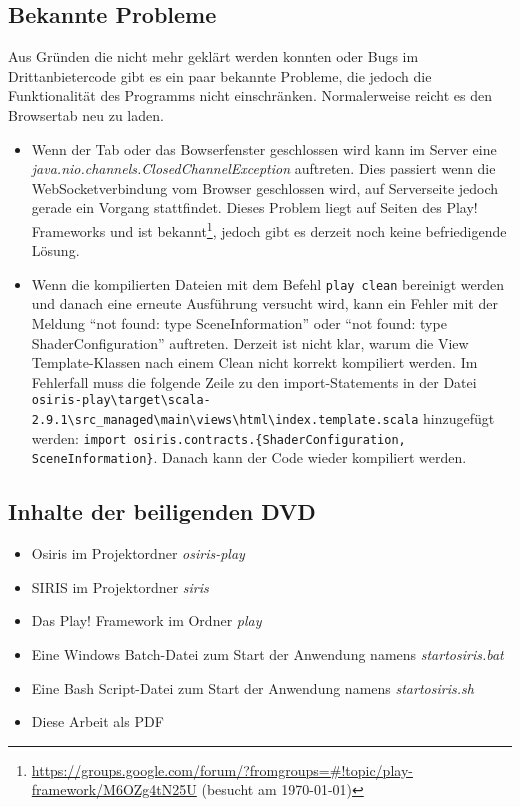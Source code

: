 \begin{appendix}
\subsection*{Bekannte Probleme}
Aus Gründen die nicht mehr geklärt werden konnten oder Bugs im Drittanbietercode gibt es ein paar bekannte Probleme, die jedoch die Funktionalität des Programms nicht einschränken. Normalerweise reicht es den Browsertab neu zu laden.
\begin{itemize}
    \item Wenn der Tab oder das Bowserfenster geschlossen wird kann im Server eine \textit{java.nio.channels.ClosedChannelException} auftreten. Dies passiert wenn die WebSocketverbindung vom Browser geschlossen wird, auf Serverseite jedoch gerade ein Vorgang stattfindet. Dieses Problem liegt auf Seiten des Play! Frameworks und ist bekannt\footnote{\url{https://groups.google.com/forum/?fromgroups=\#!topic/play-framework/M6OZg4tN25U} (besucht am \today)}, jedoch gibt es derzeit noch keine befriedigende Lösung.
    \item Wenn die kompilierten Dateien mit dem Befehl \texttt{play clean} bereinigt werden und danach eine erneute Ausführung versucht wird, kann ein Fehler mit der Meldung "`not found: type SceneInformation"' oder "`not found: type ShaderConfiguration"' auftreten. Derzeit ist nicht klar, warum die View Template-Klassen nach einem Clean nicht korrekt kompiliert werden. Im Fehlerfall muss die folgende Zeile zu den import-Statements in der Datei \texttt{osiris-play\-\textbackslash target\-\textbackslash scala-2.9.1\-\textbackslash src\_managed\-\textbackslash main\-\textbackslash views\-\textbackslash html\-\textbackslash index.template.scala} hinzugefügt werden: \texttt{import osiris.\-contracts.\-\{ShaderConfiguration,\- SceneInformation\}}. Danach kann der Code wieder kompiliert werden.
\end{itemize}

\subsection*{Inhalte der beiligenden DVD}
\begin{itemize}
    \item Osiris im Projektordner \textit{osiris-play}
    \item SIRIS im Projektordner \textit{siris}
    \item Das Play! Framework im Ordner \textit{play}
    \item Eine Windows Batch-Datei zum Start der Anwendung namens \textit{startosiris.bat}
    \item Eine Bash Script-Datei zum Start der Anwendung namens \textit{startosiris.sh}
    \item Diese Arbeit als PDF
\end{itemize}
\end{appendix}
